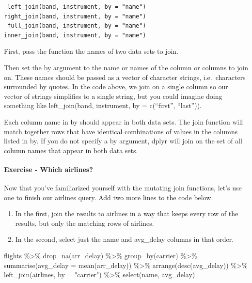 \documentclass[
]{article}
\newenvironment{Shaded}{\begin{snugshade}}{\end{snugshade}}
\newcommand{\AttributeTok}[1]{\textcolor[rgb]{0.77,0.63,0.00}{#1}}
\newcommand{\FunctionTok}[1]{\textcolor[rgb]{0.00,0.00,0.00}{#1}}
\newcommand{\NormalTok}[1]{#1}
\newcommand{\SpecialCharTok}[1]{\textcolor[rgb]{0.00,0.00,0.00}{#1}}
\newcommand{\StringTok}[1]{\textcolor[rgb]{0.31,0.60,0.02}{#1}}
\providecommand{\tightlist}{%
  \setlength{\itemsep}{0pt}\setlength{\parskip}{0pt}}
\begin{document}
\begin{verbatim}
 left_join(band, instrument, by = "name")
right_join(band, instrument, by = "name")
 full_join(band, instrument, by = "name")
inner_join(band, instrument, by = "name")
\end{verbatim}

First, pass the function the names of two data sets to join.

Then set the by argument to the name or names of the column or columns
to join on. These names should be passed as a vector of character
strings, i.e.~characters surrounded by quotes. In the code above, we
join on a single column so our vector of strings simplifies to a single
string, but you could imagine doing something like left\_join(band,
instrument, by = c(``first'', ``last'')).

Each column name in by should appear in both data sets. The join
function will match together rows that have identical combinations of
values in the columns listed in by. If you do not specify a by argument,
dplyr will join on the set of all column names that appear in both data
sets.

\hypertarget{exercise---which-airlines}{%
\paragraph{Exercise - Which airlines?}\label{exercise---which-airlines}}

Now that you've familiarized yourself with the mutating join functions,
let's use one to finish our airlines query. Add two more lines to the
code below.

\begin{enumerate}
\def\labelenumi{\arabic{enumi}.}
\tightlist
\item
  In the first, join the results to airlines in a way that keeps every
  row of the results, but only the matching rows of airlines.
\item
  In the second, select just the name and avg\_delay columns in that
  order.
\end{enumerate}

\begin{Shaded}
\begin{Highlighting}[]
\NormalTok{flights }\SpecialCharTok{\%\textgreater{}\%} 
  \FunctionTok{drop\_na}\NormalTok{(arr\_delay) }\SpecialCharTok{\%\textgreater{}\%} 
  \FunctionTok{group\_by}\NormalTok{(carrier) }\SpecialCharTok{\%\textgreater{}\%} 
  \FunctionTok{summarise}\NormalTok{(}\AttributeTok{avg\_delay =} \FunctionTok{mean}\NormalTok{(arr\_delay)) }\SpecialCharTok{\%\textgreater{}\%} 
  \FunctionTok{arrange}\NormalTok{(}\FunctionTok{desc}\NormalTok{(avg\_delay)) }\SpecialCharTok{\%\textgreater{}\%}
  \FunctionTok{left\_join}\NormalTok{(airlines, }\AttributeTok{by =} \StringTok{"carrier"}\NormalTok{) }\SpecialCharTok{\%\textgreater{}\%}
  \FunctionTok{select}\NormalTok{(name, avg\_delay)}
\end{Highlighting}
\end{Shaded}
\end{document}
